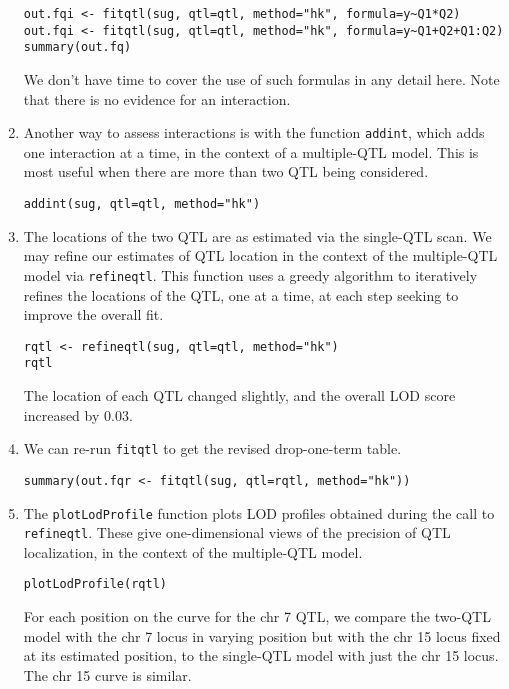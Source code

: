 \documentclass[10pt,letterpaper]{article}
\newcommand{\usercolor}{\color [named]{BlueViolet}}
\begin{document}
\begin{enumerate}
\usercolor
\verb|out.fqi <- fitqtl(sug, qtl=qtl, method="hk", formula=y~Q1*Q2)| \\
\verb|out.fqi <- fitqtl(sug, qtl=qtl, method="hk", formula=y~Q1+Q2+Q1:Q2)| \\
\verb|summary(out.fq)|
\normalcolor

We don't have time to cover the use of such formulas in any detail
here.  Note that there is no evidence for an interaction.

\item Another way to assess interactions is with the function
  \verb-addint-, which adds one interaction at a time, in the context
  of a multiple-QTL model.  This is most useful when there are more
  than two QTL being considered.

\usercolor
\verb|addint(sug, qtl=qtl, method="hk")|
\normalcolor

\item The locations of the two QTL are as estimated via the single-QTL
  scan.  We may refine our estimates of QTL location in the context of
  the multiple-QTL model via \verb-refineqtl-.  This function
  uses a greedy algorithm to iteratively refines the locations of the
  QTL, one at a time, at each step seeking to improve the overall fit.

\usercolor
\verb|rqtl <- refineqtl(sug, qtl=qtl, method="hk")| \\
\verb|rqtl|
\normalcolor

The location of each QTL changed slightly, and the overall LOD score
increased by 0.03.

\item We can re-run \verb-fitqtl- to get the revised drop-one-term
  table.

\usercolor
\verb|summary(out.fqr <- fitqtl(sug, qtl=rqtl, method="hk"))|
\normalcolor

\item The \verb-plotLodProfile- function plots LOD profiles obtained
  during the call to \verb-refineqtl-.  These give one-dimensional
  views of the precision of QTL localization, in the context of the
  multiple-QTL model.

\usercolor
\verb|plotLodProfile(rqtl)|
\normalcolor

For each position on the curve for the chr 7 QTL, we compare the
two-QTL model with the chr 7 locus in varying position but with the
chr 15 locus fixed at its estimated position, to the single-QTL model
with just the chr 15 locus.  The chr 15 curve is similar.


\end{enumerate}
\end{document}
